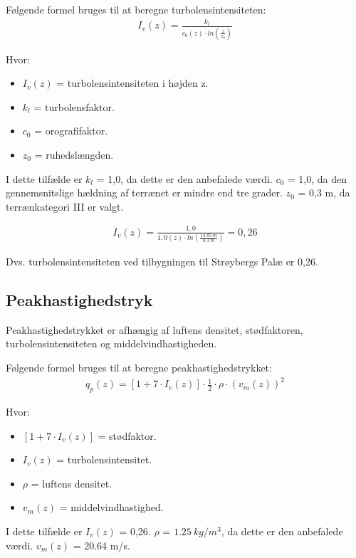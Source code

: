 Følgende formel bruges til at beregne turbolensintensiteten:
\begin{align*}
I_{v}(z) = \frac{k_{l}}{c_{0}(z) \cdot ln\left(\frac{z}{z_{0}}\right)}
\end{align*}

Hvor:
\begin{itemize}
\item $ I_{v}(z) $ = turbolensintensiteten i højden z.
\item $ k_{l} $ = turbolensfaktor.
\item $ c_{0} $ = orografifaktor.
\item $ z_{0} $ = ruhedslængden.
\end{itemize}

I dette tilfælde er $ k_{l} $ = 1,0, da dette er den anbefalede værdi. $ c_{0} $ = 1,0, da den gennemsnitslige hældning af terrænet er mindre end tre grader. $ z_{0} $ = 0,3 m, da terrænkategori III er valgt.

\begin{align*}
I_{v}(z) = \frac{1,0}{1,0(z) \cdot ln\left(\frac{\SI{14,85}{m}}{\SI{0,3}{m}}\right)} = 0,26
\end{align*}

Dvs. turbolensintensiteten ved tilbygningen til Strøybergs Palæ er 0,26.

\subsection{Peakhastighedstryk}
Peakhastighedstrykket er afhængig af luftens densitet, stødfaktoren, turbolensintensiteten og middelvindhastigheden.

Følgende formel bruges til at beregne peakhastighedstrykket:
\begin{align*}
q_{p}(z) = [1 + 7 \cdot I_{v}(z)] \cdot \frac{1}{2} \cdot \rho \cdot (v_{m}(z))^2
\end{align*}

Hvor:
\begin{itemize}
\item $ [1 + 7 \cdot I_{v}(z)] $ = stødfaktor.
\item $ I_{v}(z) $ = turbolensintensitet.
\item $ \rho $ = luftens densitet.
\item $ v_{m}(z) $ = middelvindhastighed.
\end{itemize}

I dette tilfælde er $ I_{v}(z) $ = 0,26. $ \rho $ = $ \SI{1,25}{kg/m^3} $, da dette er den anbefalede værdi. $ v_{m}(z) $ = 20.64 m/s.

